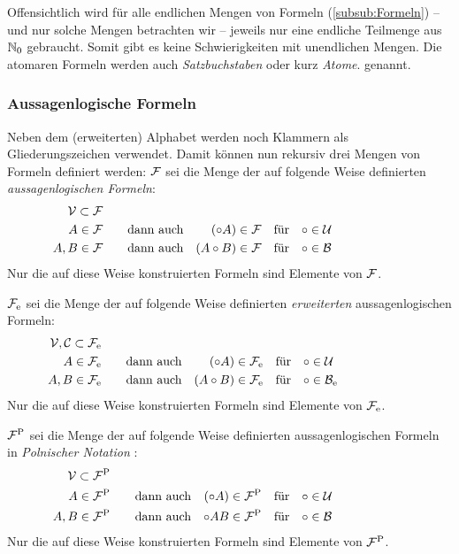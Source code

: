 \documentclass[english,ngerman,parskip=half,headsepline,footsepline,
	fleqn,notitlepage]{scrreprt}
\newcommand*{\Idx}[1]{#1\idx{#1}}%
\newcommand*{\formulatoleft}{&&&&&&&&&&}%
\begin{document}
	Offensichtlich wird für alle endlichen Mengen von Formeln
	(\seename \vref{subsub:Formeln})
	-- und nur solche Mengen betrachten wir --
	jeweils nur eine endliche Teilmenge aus $\mathbb{N}_0$ gebraucht.
	Somit gibt es keine Schwierigkeiten mit unendlichen Mengen.
	Die atomaren Formeln werden auch \emph{\Idx{Satzbuchstabe}}\emph{n}
	oder kurz \emph{\Idx{Atom}}\emph{e}. genannt.

	\subsubsection{Aussagenlogische Formeln}%
	\label{subsub:Formeln}

	Neben dem (erweiterten) Alphabet
	werden noch Klammern als Gliederungszeichen verwendet.
	Damit können nun rekursiv drei Mengen von Formeln definiert werden:
	$\mathcal{F}$ sei die Menge der auf folgende Weise definierten
	\emph{aussagenlogischen Formeln}:
	\begin{align}
		\asV    \subset \asF \\
		A           \in \asF &   \quad \quad \textrm{dann auch} &
		(\circ A)   \in \asF & & \textrm{für} \quad & \circ \in \asU \\
		A, B        \in \asF &   \quad \quad \textrm{dann auch} &
		(A \circ B) \in \asF & & \textrm{für} \quad & \circ \in \asB
		\formulatoleft
	\end{align}
	Nur die auf diese Weise konstruierten Formeln sind Elemente von $\mathcal{F}$.

	$\mathcal{F}_\mathrm{e}$ sei die Menge der auf folgende Weise definierten \emph{erweiterten}
	aussagenlogischen Formeln:
	\begin{align}
		\asV, \asC \subset \asFe \\
		A              \in \asFe & \quad \quad \textrm{dann auch} &
		(\circ A)      \in \asFe & & \textrm{für} \quad & \circ \in \asU  \\
		A, B           \in \asFe & \quad \quad \textrm{dann auch} &
		(A \circ B)    \in \asFe & & \textrm{für} \quad & \circ \in \asBe
		\formulatoleft
	\end{align}
	Nur die auf diese Weise konstruierten Formeln sind Elemente von $\mathcal{F}_\mathrm{e}$.

	$\mathcal{F}^\mathrm{P}$ sei die Menge der auf folgende Weise definierten
	aussagenlogischen Formeln in \emph{Polnischer Notation}%
	:
	\begin{align}
		\asV    \subset \asFp \\
		A           \in \asFp &   \quad \quad \textrm{dann auch} &
		(\circ A)   \in \asFp & & \textrm{für} \quad & \circ \in \asU \\
		A, B        \in \asFp &   \quad \quad \textrm{dann auch} &
		\circ A B   \in \asFp & & \textrm{für} \quad & \circ \in \asB
		\formulatoleft
	\end{align}
	Nur die auf diese Weise konstruierten Formeln sind Elemente von $\mathcal{F}^\mathrm{P}$.
\end{document}
